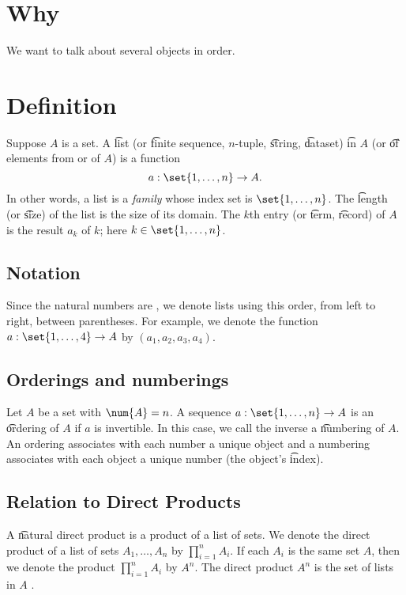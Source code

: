 
\section*{Why}

We want to talk about several objects in order.

\section*{Definition}

Suppose $A$ is a set.
A \t{list} (or \t{finite sequence}, \t{$n$-tuple}, \t{string}, \t{dataset}) \t{in} $A$ (or \t{of} elements from or of $A$) is a function
\[
a: \set{1, \dots , n} \to A.
\]
In other words, a list is a \textit{family} whose index set is $\set{1, \dots , n}$.
The \t{length} (or \t{size}) of the list is the size of its domain.
The \t{$k$th entry} (or \t{term}, \t{record}) of $A$ is the result $a_k$ of $k$; here $k \in \set{1, \dots , n}$.

\subsection*{Notation}

Since the natural numbers are , we denote lists using this order, from left to right, between parentheses.
For example, we denote the function $a: \set{1, \dots , 4} \to A$ by $(a_1, a_2, a_3, a_4)$.

\subsection*{Orderings and numberings}

Let $A$ be a set with $\num{A} = n$.
A sequence $a: \set{1, \dots , n} \to A$ is an \t{ordering} of $A$ if $a$ is invertible.
In this case, we call the inverse a \t{numbering} of $A$.
An ordering associates with each number a unique object and a numbering associates with each object a unique number (the object's \t{index}).

\subsection*{Relation to Direct Products}

A \t{natural direct product} is a product of a list of sets.
We denote the direct product of a list of sets $A_1, \dots , A_n$ by $\prod_{i = 1}^{n} A_i$.
If each $A_i$ is the same set $A$, then we denote the product $\prod_{i = 1}^{n} A_i$ by $A^n$.
The direct product $A^n$ is the set of lists in $A$ .

